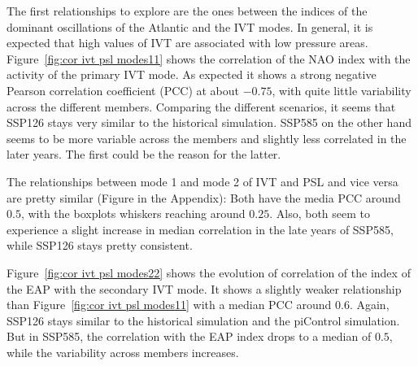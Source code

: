 The first relationships to explore are the ones between the indices of the dominant oscillations of the Atlantic and the IVT modes. 
In general, it is expected that high values of IVT are associated with low pressure areas.
Figure~\ref{fig:cor ivt psl modes11} shows the correlation of the NAO index with the activity of the primary IVT mode. 
As expected it shows a strong negative Pearson correlation coefficient (PCC) at about $-0.75$, with quite little variability across the different members. 
Comparing the different scenarios, it seems that SSP126 stays very similar to the historical simulation. 
SSP585 on the other hand seems to be more variable across the members and slightly less correlated in the later years. The first could be the reason for the latter. 

%

The relationships between mode 1 and mode 2 of IVT and PSL and vice versa are pretty similar (Figure in the Appendix): 
Both have the media PCC around $0.5$, with the boxplots whiskers reaching around $0.25$. 
Also, both seem to experience a slight increase in median correlation in the late years of SSP585, while SSP126 stays pretty consistent. 




%
%

Figure~\ref{fig:cor ivt psl modes22} shows the evolution of correlation of the index of the EAP with the secondary IVT mode. 
It shows a slightly weaker relationship than Figure~\ref{fig:cor ivt psl modes11} with a median PCC around $0.6$. 
Again, SSP126 stays similar to the historical simulation and the piControl simulation. 
But in SSP585, the correlation with the EAP index drops to a median of $0.5$, while the variability across members increases. 




